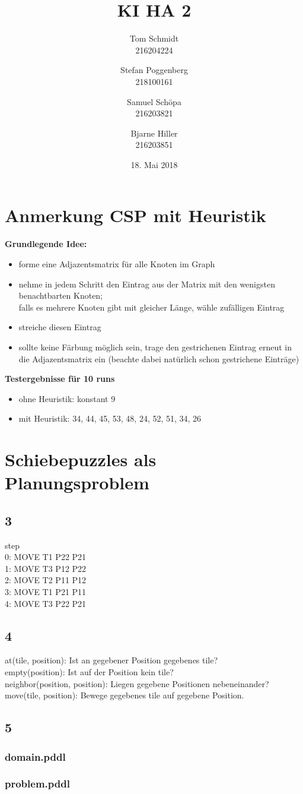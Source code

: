 \documentclass[fleqn]{scrartcl}
\author{Tom Schmidt\\216204224 \and Stefan Poggenberg\\218100161 \and Samuel Schöpa\\216203821 \and Bjarne Hiller\\216203851}
\title{KI HA 2}
\date{18. Mai 2018}
\begin{document}
\maketitle
\section{Anmerkung CSP mit Heuristik}
\textbf{Grundlegende Idee:}
 \begin{itemize}
	\item forme eine Adjazentsmatrix für alle Knoten im Graph
	\item nehme in jedem Schritt den Eintrag aus der Matrix mit den wenigsten benachtbarten Knoten; \\ falls es mehrere Knoten gibt mit gleicher Länge, wähle zufälligen Eintrag	
	\item streiche diesen Eintrag 
	\item sollte keine Färbung möglich sein, trage den gestrichenen Eintrag erneut in die Adjazentsmatrix ein (beachte dabei natürlich schon gestrichene Einträge)
\end{itemize}
\textbf{Testergebnisse für 10 runs}
\begin{itemize}
	\item[] ohne Heuristik: konstant 9
	\item[] mit Heuristik: 34, 44, 45, 53, 48, 24, 52, 51, 34,  26
\end{itemize}
\section{Schiebepuzzles als Planungsproblem}
\subsection{3}
step \\
        0: MOVE T1 P22 P21 \\
        1: MOVE T3 P12 P22 \\
        2: MOVE T2 P11 P12 \\
        3: MOVE T1 P21 P11 \\
        4: MOVE T3 P22 P21 %
\subsection{4}
  at(tile, position): Ist an gegebener Position gegebenes tile? \\
  empty(position): Ist auf der Position kein tile? \\
  neighbor(position, position): Liegen gegebene Positionen nebeneinander? \\
  move(tile, position): Bewege gegebenes tile auf gegebene Position. \\
\subsection{5}
\subsubsection{domain.pddl}

\subsubsection{problem.pddl}

\end{document}
